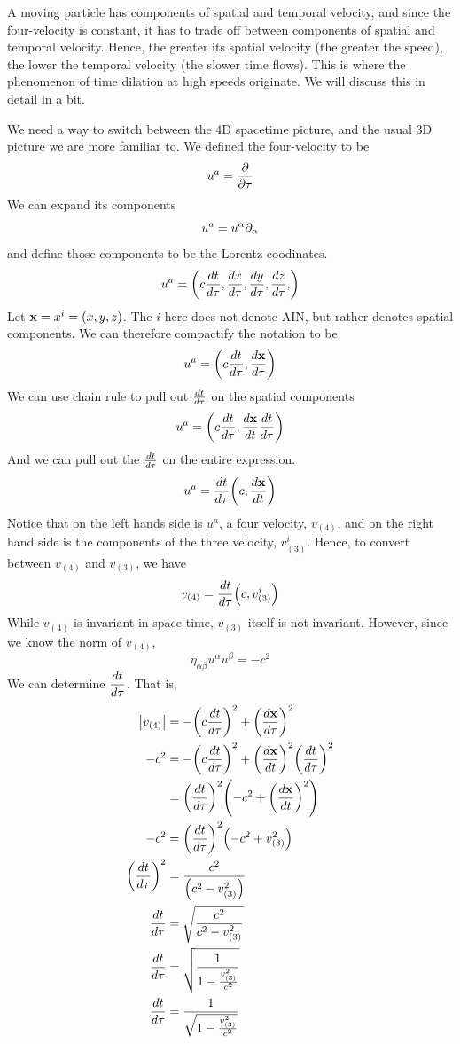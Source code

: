 		A moving particle has components of spatial
		and temporal velocity, and since the four-velocity is constant, it has 
		to trade off between components of spatial and temporal velocity. Hence, 
		the greater its spatial velocity (the greater the speed), the lower the temporal
		velocity (the slower time flows). This is where the phenomenon of time dilation 
		at high speeds originate. We will discuss this in detail in a bit. 

		We need a way to switch between the 4D spacetime picture,
		and the usual 3D picture we are more familiar to. We defined
		the four-velocity to be
		\[
			u^a = \pdv{}{\tau} 
		\]
		We can expand its components 
		\[
			u^a = u^\alpha \partial_\alpha 
		\]
		and define those components to be the Lorentz coodinates.
		\[
			u^a = \pqty{
				c\dv{t}{\tau},
				\dv{x}{\tau},
				\dv{y}{\tau},
				\dv{z}{\tau},
			}
		\]
		Let $\vb{x} = x^i = (x,y,z)$. The $i$ here does not denote AIN, but rather denotes spatial components.
		We can therefore compactify the notation to be
		\[
			u^a = \pqty{
				c \dv{t}{\tau},
				\dv{\vb{x}}{\tau} 
			}
		\]
		We can use chain rule to pull out $\dv{t}{\tau}$ on the spatial components
		\[
			u^a 
			=
			\pqty{
				c \dv{t}{\tau},
				\dv{\vb{x}}{t} \dv{t}{\tau}  
			}
		\]
		And we can pull out the $\dv{t}{\tau}$ on the entire expression.
		\[
			u^a 
			=
			\dv{t}{\tau} 
			\pqty{
				c,
				\dv{\vb{x}}{t} 
			}
		\]
		Notice that on the left hands side is $u^a$, a four velocity, $v_{(4)}$,
		and on the right hand side is the components of the three velocity, $v^i_{(3)}$.
		Hence, to convert between $v_{(4)}$ and $v_{(3)}$, we have
		\[
			v_{(4)}
			=
			\dv{t}{\tau}
			\pqty{
				c,
				v^i_{(3)}
			}
		\]
		While $v_{(4)}$ is invariant in space time, $v_{(3)}$ itself 
		is not invariant. However, since we know the norm of $v_{(4)}$,
		\[
			\eta_{\alpha\beta}u^\alpha u^\beta = -c^2
		\]
		We can determine $\displaystyle\dv{t}{\tau}$.
		That is,
		\begin{align*}
			\abs{v_{(4)}} 
			&= 
			-
			\pqty{
				c \dv{t}{\tau} 
			}^2
			+
			\pqty{
				\dv{\vb{x}}{\tau} 
			}^2\\
			-c^2
			&=
			-
			\pqty{
				c \dv{t}{\tau} 
			}^2
			+
			\pqty{
				\dv{\vb{x}}{t} 
			}^2
			\pqty{
				\dv{t}{\tau} 
			}^2
			\\
			&=
			\pqty{
				\dv{t}{\tau} 
			}^2
			\pqty{
				-c^2
			+
				\pqty{
					\dv{\vb{x}}{t} 
				}^2
			}
			\\
			-c^2
			&=
			\pqty{
				\dv{t}{\tau} 
			}^2
			\pqty{
				-c^2
			+
				v^2_{(3)}	
			}\\
			\pqty{
				\dv{t}{\tau} 
			}^2
			&=
			\frac{
				c^2
			}{
				\pqty{
					c^2
				-
					v^2_{(3)}	
				}
			}
			\\
			\dv{t}{\tau} 
			&=
			\sqrt{
				\frac{
					c^2
				}{
					{
						c^2
					-
						v^2_{(3)}	
					}
				}
			}
			\\
			\dv{t}{\tau} 
			&=
			\sqrt{
				\frac{
					1
				}{
					{
						1
						-
						\frac{
							v^2_{(3)}	
						}{c^2} 
					}
				}
			}
			\\
			\dv{t}{\tau} 
			&=
			\frac{
					1
				}{
					\sqrt{
						1
						-
						\frac{
							v^2_{(3)}	
						}{c^2} 
					}
				}
		\end{align*}
